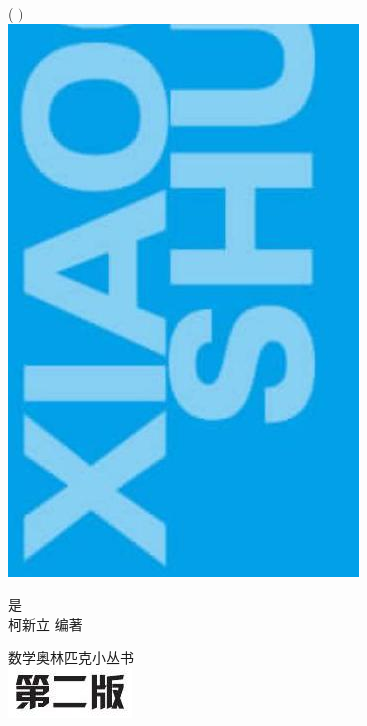\documentclass[10pt]{article}
\begin{document}
( $)$\\
\includegraphics[max width=\textwidth, center]{2024_10_30_66b8e5e701da2093c133g-001(2)}

是\\
柯新立 编著

数学奥林匹克小丛书\\
\includegraphics[max width=\textwidth, center]{2024_10_30_66b8e5e701da2093c133g-002(1)}
\end{document}
